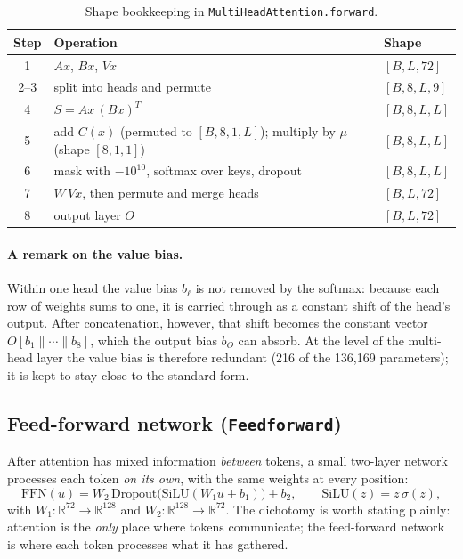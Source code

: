 \documentclass[11pt]{article}
\newcommand{\code}[1]{\texttt{#1}}
\newcommand{\R}{\mathbb{R}}
\begin{document}
\begin{table}[h]
\centering\small
\caption{Shape bookkeeping in \code{MultiHeadAttention.forward}.}
\label{tab:mha}
\begin{tabular}{@{}cll@{}}
\toprule
Step & Operation & Shape \\
\midrule
1 & $Ax$, $Bx$, $Vx$ & $[B,L,72]$ \\
2--3 & split into heads and permute & $[B,8,L,9]$ \\
4 & $S=Ax\,(Bx)^T$ & $[B,8,L,L]$ \\
5 & add $C(x)$ (permuted to $[B,8,1,L]$); multiply by $\mu$ (shape $[8,1,1]$) & $[B,8,L,L]$ \\
6 & mask with $-10^{10}$, softmax over keys, dropout & $[B,8,L,L]$ \\
7 & $W\,Vx$, then permute and merge heads & $[B,L,72]$ \\
8 & output layer $O$ & $[B,L,72]$ \\
\bottomrule
\end{tabular}
\end{table}

\paragraph{A remark on the value bias.} Within one head the value bias $b_\ell$ is not
removed by the softmax: because each row of weights sums to one, it is carried through
as a constant shift of the head's output. After concatenation, however, that shift
becomes the constant vector $O[b_1\|\cdots\|b_8]$, which the output bias $b_O$ can
absorb. At the level of the multi-head layer the value bias is therefore redundant
(216 of the 136{,}169 parameters); it is kept to stay close to the standard form.

\subsection{Feed-forward network (\code{Feedforward})}

After attention has mixed information \emph{between} tokens, a small two-layer
network processes each token \emph{on its own}, with the same weights at every
position:
\begin{equation}
  \mathrm{FFN}(u) = W_2\,\mathrm{Dropout}\big(\mathrm{SiLU}(W_1u+b_1)\big)+b_2,
  \qquad \mathrm{SiLU}(z)=z\,\sigma(z),
\end{equation}
with $W_1:\R^{72}\to\R^{128}$ and $W_2:\R^{128}\to\R^{72}$. The dichotomy is worth
stating plainly: attention is the \emph{only} place where tokens communicate; the
feed-forward network is where each token processes what it has gathered.
\end{document}
